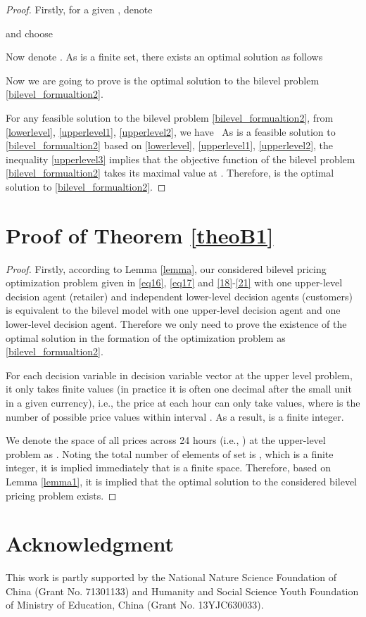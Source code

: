 \documentclass[10pt,journal]{IEEEtran}
\theoremstyle{definition}
\theoremstyle{plain} \newtheorem{theo}{Theorem} \newtheorem{prop}{Proposition}  \newtheorem{lemm}{Lemma}
\begin{document}
\begin{proof}
Firstly, for a given , denote  

and choose 


Now denote . As  is a finite set, there exists an optimal solution as follows


Now we are going to prove  is the optimal solution to the bilevel problem \eqref{bilevel_formualtion2}.

For any feasible solution  to the bilevel problem \eqref{bilevel_formualtion2}, from \eqref{lowerlevel}, \eqref{upperlevel1}, \eqref{upperlevel2}, we have
\
As  is a feasible solution to \eqref{bilevel_formualtion2} based on \eqref{lowerlevel}, \eqref{upperlevel1}, \eqref{upperlevel2}, the inequality \eqref{upperlevel3} implies that the objective function of the bilevel problem \eqref{bilevel_formualtion2} takes its maximal value at . Therefore,  is the optimal solution to \eqref{bilevel_formualtion2}.
\end{proof}

\section{Proof of Theorem \ref{theoB1}} \label{appendix C}

\begin{proof}
Firstly, according to Lemma \ref{lemma}, our considered bilevel pricing optimization problem given in \eqref{eq16}, \eqref{eq17} and \eqref{18}-\eqref{21} with one upper-level decision agent (retailer) and  independent lower-level decision agents (customers) is equivalent to the bilevel model with one upper-level decision agent and one lower-level decision agent. Therefore we only need to prove the existence of the optimal solution in the formation of the optimization problem as \eqref{bilevel_formualtion2}. 



For each decision variable  in decision variable vector  at the upper level problem, it only takes finite values (in practice it is often one decimal after the small unit in a given currency), i.e., the price at each hour  can only take  values, where  is the number of possible price values within interval . As a result,  is a finite integer. 

We denote the space of all prices across 24 hours (i.e., ) at the upper-level problem as . Noting the total number of elements of set  is , which is a finite integer, it is implied immediately that  is a finite space. Therefore, based on Lemma \ref{lemma1}, it is implied that the optimal solution to the considered bilevel pricing problem exists.

\end{proof}

\section*{Acknowledgment}

This work is partly supported by the National Nature Science Foundation of China (Grant No. 71301133) and Humanity and Social Science Youth Foundation of Ministry of Education, China (Grant No. 13YJC630033).

\balance







\end{document}
